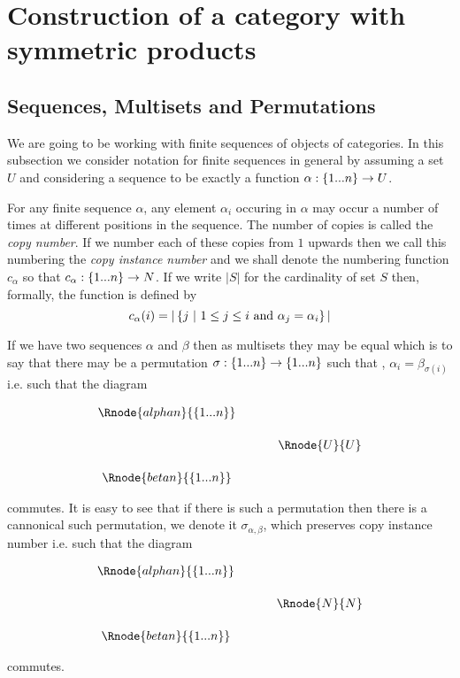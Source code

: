 \documentclass[10pt,a4paper]{scrartcl}
\begin{document}
\section{Construction of a category with symmetric products}
\subsection{Sequences, Multisets and Permutations}

We are going to be working with finite sequences of objects of categories. In this subsection we 
consider notation for finite sequences in general by assuming a set $U$ and considering a sequence to be exactly a function $\alpha: \left\{1...n\right\} \rightarrow U$.

For any finite sequence $\alpha$, any element $\alpha_i$ occuring in $\alpha$ may occur a number of times at 
different positions in the sequence. The number of copies is called the \textit{copy number}. If we number each of these copies from $1$ upwards then we call this numbering the \textit{copy instance number} and we shall denote
the numbering function  $c_\alpha$ so that $c_\alpha: \left\{1...n\right\} \rightarrow N$. If we write
$|S|$ for the cardinality of set $S$ then, 
formally,
the function is defined by
$$
c_\alpha(i) = |\left\{j \ \middle|\ 1 \leq j \leq i \mbox{ and }\alpha_j=\alpha_i\right\}|
$$

If we have two sequences $\alpha$ and $\beta$ then as multisets they may be equal 
which is to say that there may be a permutation $\sigma: \left\{1...n\right\} \rightarrow \left\{1...n\right\}$ such that 
\foreachi, $\alpha_i = \beta_{\sigma(i)}$
i.e. such that the diagram

\begin{center}
\begin{equation}
\label{permutingcontexts}
\begin{array}{cp{.5cm}c}
\Rnode{alphan}{\set{\n}}&&                  \\ [0.5cm]
                        &&   \Rnode{U}{U}   \\ [0.5cm]
\Rnode{betan}{\set{\n}} &&                           
\end{array}
\end{equation}
\alabel{\alpha}
\blabel{\beta}
\blabel{\sigma}
\end{center}
commutes. It is easy to see that if there is such a permutation then there is a cannonical such
permutation, we denote it $\sigma_{\alpha,\beta}$, which preserves copy instance number i.e. such that the diagram
\begin{center}
\begin{equation}
\label{preservingcopynumber}
\begin{array}{cp{.5cm}c}
\Rnode{alphan}{\set{\n}}  &&              \\ [0.5cm]
												  && \Rnode{N}{N} \\ [0.5cm]
\Rnode{betan}{\set{\n}}   &&            
\end{array}
\end{equation}
\blabel{\sigma_{\alpha,\beta}}
\end{center}				
commutes.
\end{document}
